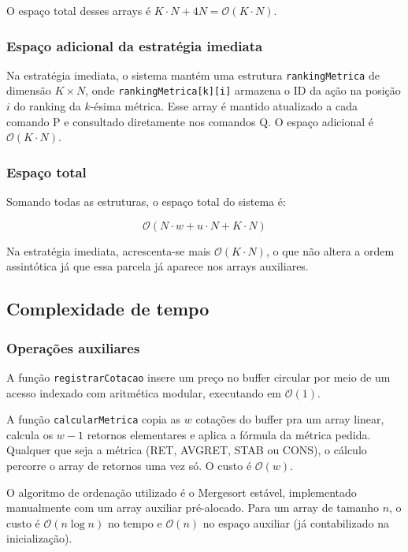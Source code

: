 \documentclass[12pt,a4paper]{article}
\begin{document}
O espaço total desses arrays é $K \cdot N + 4N = \mathcal{O}(K \cdot N)$.

\subsubsection*{Espaço adicional da estratégia imediata}

Na estratégia imediata, o sistema mantém uma estrutura \texttt{rankingMetrica} de dimensão $K \times N$, onde \texttt{rankingMetrica[k][i]} armazena o ID da ação na posição $i$ do ranking da $k$-ésima métrica. Esse array é mantido atualizado a cada comando P e consultado diretamente nos comandos Q. O espaço adicional é $\mathcal{O}(K \cdot N)$.

\subsubsection*{Espaço total}

Somando todas as estruturas, o espaço total do sistema é:

$$ \mathcal{O}(N \cdot w + u \cdot N + K \cdot N) $$

Na estratégia imediata, acrescenta-se mais $\mathcal{O}(K \cdot N)$, o que não altera a ordem assintótica já que essa parcela já aparece nos arrays auxiliares.

\subsection{Complexidade de tempo}

\subsubsection*{Operações auxiliares}

A função \texttt{registrarCotacao} insere um preço no buffer circular por meio de um acesso indexado com aritmética modular, executando em $\mathcal{O}(1)$.

A função \texttt{calcularMetrica} copia as $w$ cotações do buffer pra um array linear, calcula os $w - 1$ retornos elementares e aplica a fórmula da métrica pedida. Qualquer que seja a métrica (RET, AVGRET, STAB ou CONS), o cálculo percorre o array de retornos uma vez só. O custo é $\mathcal{O}(w)$.

O algoritmo de ordenação utilizado é o Mergesort estável, implementado manualmente com um array auxiliar pré-alocado. Para um array de tamanho $n$, o custo é $\mathcal{O}(n \log n)$ no tempo e $\mathcal{O}(n)$ no espaço auxiliar (já contabilizado na inicialização).
\end{document}
